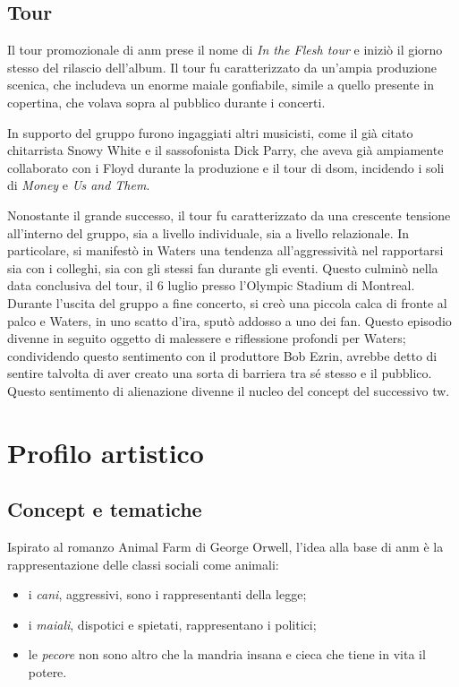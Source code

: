 \documentclass[class=book, crop=false, oneside, 12pt]{standalone}
\begin{document}
    \subsection{Tour}
    Il tour promozionale di \acrshort{anm} prese il nome di \emph{In the Flesh tour} e iniziò il giorno stesso del rilascio dell'album. Il tour fu caratterizzato da un'ampia produzione scenica, che includeva un enorme maiale gonfiabile, simile a quello presente in copertina, che volava sopra al pubblico durante i concerti. 

    In supporto del gruppo furono ingaggiati altri musicisti, come il già citato chitarrista Snowy White e il sassofonista Dick Parry, che aveva già ampiamente collaborato con i Floyd durante la produzione e il tour di \acrlong{dsom}, incidendo i soli di \emph{Money} e \emph{Us and Them}.

    Nonostante il grande successo, il tour fu caratterizzato da una crescente tensione all'interno del gruppo, sia a livello individuale, sia a livello relazionale. In particolare, si manifestò in Waters una tendenza all'aggressività nel rapportarsi sia con i colleghi, sia con gli stessi fan durante gli eventi. Questo culminò nella data conclusiva del tour, il 6 luglio presso l'Olympic Stadium di Montreal. Durante l'uscita del gruppo a fine concerto, si creò una piccola calca di fronte al palco  e Waters, in uno scatto d'ira, sputò addosso a uno dei fan. Questo episodio divenne in seguito oggetto di malessere e riflessione profondi per Waters; condividendo questo sentimento con il produttore Bob Ezrin, avrebbe detto di sentire talvolta di aver creato una sorta di barriera tra sé stesso e il pubblico. Questo sentimento di alienazione divenne il nucleo del concept del successivo \acrlong{tw}.
    
    \section{Profilo artistico}\label{sec:02-music}

    \subsection{Concept e tematiche}
    \label{subsec:animals-concept}
    Ispirato al romanzo Animal Farm di George Orwell, l'idea alla base di \acrshort{anm} è la rappresentazione delle classi sociali come  animali: 
    \begin{itemize}
        \item i \emph{cani}, aggressivi, sono i rappresentanti della legge;
        \item i \emph{maiali}, dispotici e spietati, rappresentano i politici;
        \item le \emph{pecore} non sono altro che la mandria insana e cieca che tiene in vita il potere.
    \end{itemize}
    
\end{document}
